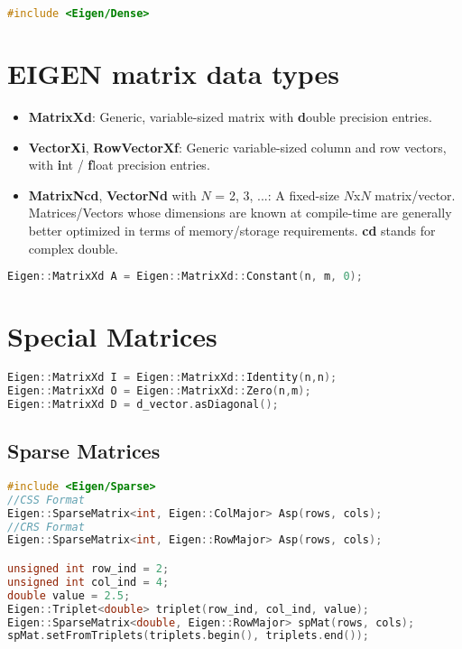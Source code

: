 \documentclass[12pt]{article}
\author{\authorVar}
\title{\titleVar}
\date{\dateVar}
\newcommand{\tocr}{
\renewcommand\cftaftertoctitle{\par\noindent\hrulefill\par\vskip-0.65em}
\tableofcontents
\noindent\hrulefill
}
\begin{document}
\maketitle

\begin{lstlisting}[language=c++]
#include <Eigen/Dense>
\end{lstlisting}

\tocr

\thispagestyle{fancy}

\section{EIGEN matrix data types}
\begin{itemize}
\item \textbf{MatrixXd}: Generic, variable-sized matrix with \textbf{d}ouble precision entries.
\item \textbf{VectorXi}, \textbf{RowVectorXf}: Generic variable-sized column and row vectors, with \textbf{i}nt / \textbf{f}loat precision entries.
\item \textbf{MatrixNcd}, \textbf{VectorNd} with $N$ = 2, 3, ...: A fixed-size $N$x$N$ matrix/vector. Matrices/Vectors whose dimensions are known at compile-time are generally better optimized in terms of memory/storage requirements. \textbf{cd} stands for complex double.
\end{itemize}
\begin{lstlisting}[language=c++]
Eigen::MatrixXd A = Eigen::MatrixXd::Constant(n, m, 0);
\end{lstlisting}
\section{Special Matrices}
\begin{lstlisting}[language=c++]
Eigen::MatrixXd I = Eigen::MatrixXd::Identity(n,n);
Eigen::MatrixXd O = Eigen::MatrixXd::Zero(n,m);
Eigen::MatrixXd D = d_vector.asDiagonal();
\end{lstlisting}
\subsection{Sparse Matrices}
\begin{lstlisting}[language=c++]
#include <Eigen/Sparse>
//CSS Format
Eigen::SparseMatrix<int, Eigen::ColMajor> Asp(rows, cols);
//CRS Format
Eigen::SparseMatrix<int, Eigen::RowMajor> Asp(rows, cols);

unsigned int row_ind = 2;
unsigned int col_ind = 4;
double value = 2.5;
Eigen::Triplet<double> triplet(row_ind, col_ind, value);
Eigen::SparseMatrix<double, Eigen::RowMajor> spMat(rows, cols);
spMat.setFromTriplets(triplets.begin(), triplets.end());
\end{lstlisting}
\end{document}
